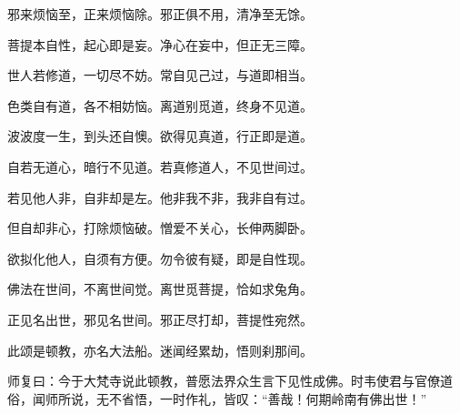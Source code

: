 \documentclass[12pt,twoside,openany]{book}
\begin{document}
邪来烦恼至，正来烦恼除。邪正俱不用，清净至无馀。

菩提本自性，起心即是妄。净心在妄中，但正无三障。

世人若修道，一切尽不妨。常自见己过，与道即相当。

色类自有道，各不相妨恼。离道别觅道，终身不见道。

波波度一生，到头还自懊。欲得见真道，行正即是道。

自若无道心，暗行不见道。若真修道人，不见世间过。

若见他人非，自非却是左。他非我不非，我非自有过。

但自却非心，打除烦恼破。憎爱不关心，长伸两脚卧。

欲拟化他人，自须有方便。勿令彼有疑，即是自性现。

佛法在世间，不离世间觉。离世觅菩提，恰如求兔角。

正见名出世，邪见名世间。邪正尽打却，菩提性宛然。

此颂是顿教，亦名大法船。迷闻经累劫，悟则刹那间。

师复曰：今于大梵寺说此顿教，普愿法界众生言下见性成佛。时韦使君与官僚道俗，闻师所说，无不省悟，一时作礼，皆叹：“善哉！何期岭南有佛出世！”
\end{document}
